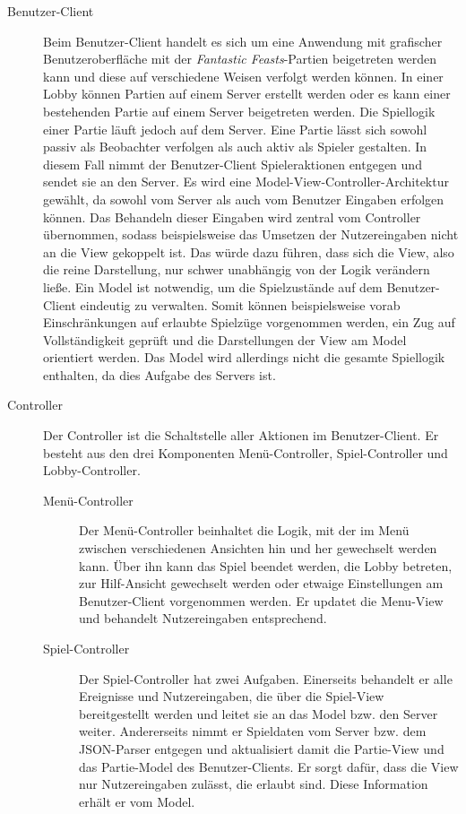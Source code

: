 		\begin{description}
			\item[Benutzer-Client]
			Beim Benutzer-Client handelt es sich um eine Anwendung mit grafischer Benutzeroberfläche mit der \textit{Fantastic Feasts}-Partien beigetreten werden kann und diese auf verschiedene Weisen verfolgt werden können. In einer Lobby können Partien auf einem Server erstellt werden oder es kann einer bestehenden Partie auf einem Server beigetreten werden. Die Spiellogik einer Partie läuft jedoch auf dem Server. Eine Partie lässt sich sowohl passiv als Beobachter verfolgen als auch aktiv als Spieler gestalten. In diesem Fall nimmt der Benutzer-Client Spieleraktionen entgegen und sendet sie an den Server.
			Es wird eine Model-View-Controller-Architektur gewählt, da sowohl vom Server als auch vom Benutzer Eingaben erfolgen können. Das Behandeln dieser Eingaben wird zentral vom Controller übernommen, sodass beispielsweise das Umsetzen der Nutzereingaben nicht an die View gekoppelt ist. Das würde dazu führen, dass sich die View, also die reine Darstellung, nur schwer unabhängig von der Logik verändern ließe. Ein Model ist notwendig, um die Spielzustände auf dem Benutzer-Client eindeutig zu verwalten. Somit können beispielsweise vorab Einschränkungen auf erlaubte Spielzüge vorgenommen werden, ein Zug auf Vollständigkeit geprüft und die Darstellungen der View am Model orientiert werden. Das Model wird allerdings nicht die gesamte Spiellogik enthalten, da dies Aufgabe des Servers ist.
			
			\item[Controller]
			Der Controller ist die Schaltstelle aller Aktionen im Benutzer-Client. Er besteht aus den drei Komponenten Menü-Controller, Spiel-Controller und Lobby-Controller.		
			
			\begin{description}
				\item[Menü-Controller]
				Der Menü-Controller beinhaltet die Logik, mit der im Menü zwischen verschiedenen Ansichten hin und her gewechselt werden kann. Über ihn kann das Spiel beendet werden, die Lobby betreten, zur Hilf-Ansicht gewechselt werden oder etwaige Einstellungen am Benutzer-Client vorgenommen werden. Er updatet die Menu-View und behandelt Nutzereingaben entsprechend. 
				
				\item[Spiel-Controller]
				Der Spiel-Controller hat zwei Aufgaben. Einerseits behandelt er alle Ereignisse und Nutzereingaben, die über die Spiel-View bereitgestellt werden und leitet sie an das Model bzw. den Server weiter. Andererseits nimmt er Spieldaten vom Server bzw. dem JSON-Parser entgegen und aktualisiert damit die Partie-View und das Partie-Model des Benutzer-Clients. Er sorgt dafür, dass die View nur Nutzereingaben zulässt, die erlaubt sind. Diese Information erhält er vom Model.
				

\end{description}
\end{description}
